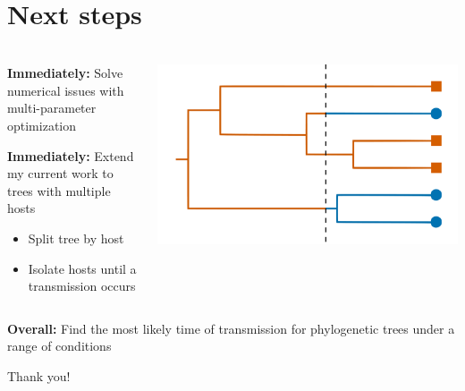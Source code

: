 \documentclass[aspectratio=169]{beamer}
\begin{document}
\section{Next steps}

\begin{frame} \frametitle{\insertsection}
    
    \begin{columns}

        \begin{column}{0.5\textwidth}

            \textbf{Immediately:} Solve numerical issues with multi-parameter optimization 

            \textbf{Immediately:} Extend my current work to trees with multiple hosts

            \begin{itemize}
                \item{Split tree by host}
                \item{Isolate hosts until a transmission occurs}
            \end{itemize}
            
        \end{column}

        \begin{column}{0.5\textwidth}

            \centering\includegraphics[width=\textwidth]{images/tree-option1}

        \end{column}

    \end{columns}
    
    \vfill

    \textbf{Overall:} Find the most likely time of transmission for phylogenetic
    trees under a range of conditions 

\end{frame}

\begin{frame}

    \begin{center}

        \begin{Huge}

            Thank you!

        \end{Huge}


    \end{center}

\end{frame}
\end{document}
